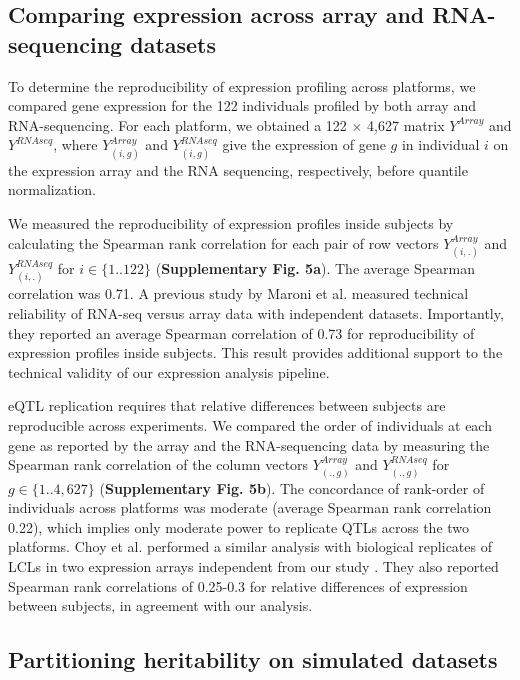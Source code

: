 \subsection{Comparing expression across array and RNA-sequencing datasets}

To determine the reproducibility of expression profiling across
platforms, we compared gene expression for the 122 individuals profiled
by both array and RNA-sequencing. For each platform, we obtained a 122
$\times$ 4,627 matrix $Y^{Array}$ and $Y^{RNAseq}$, where
$Y_{(i,g)}^{Array}$ and $Y_{(i,g)}^{RNAseq}$ give the expression of gene
$g$ in individual $i$ on the expression array and the RNA sequencing,
respectively, before quantile normalization.

We measured the reproducibility of expression profiles inside subjects
by calculating the Spearman rank correlation for each pair of row
vectors $Y_{(i,.)}^{Array}$ and $Y_{(i,.)}^{RNAseq}$ for
$i\in\{1..122\}$ (\textbf{Supplementary Fig. 5a}). The average Spearman correlation was 0.71. A previous
study by Maroni et al. \cite{MarioniMasonManeEtAl2008} measured technical reliability of
RNA-seq versus array data with independent datasets. Importantly, they
reported an average Spearman correlation of 0.73 for reproducibility of
expression profiles inside subjects. This result provides additional
support to the technical validity of our expression analysis pipeline.

eQTL replication requires that relative differences between
subjects are reproducible across experiments. We compared the order of
individuals at each gene as reported by the array and the RNA-sequencing
data by measuring the Spearman rank correlation of the column vectors
$Y_{(.,g)}^{Array}$ and $Y_{(.,g)}^{RNAseq}$ for $g\in\{1..4,627\}$ (\textbf{Supplementary Fig. 5b}). The
concordance of rank-order of individuals across platforms was moderate
(average Spearman rank correlation 0.22), which implies only moderate
power to replicate QTLs across the two platforms. Choy et al. performed
a similar analysis with biological replicates of LCLs in two expression
arrays independent from our study \cite{ChoyYelenskyBonakdarEtAl2008}. They also reported
Spearman rank correlations of 0.25-0.3 for relative differences of
expression between subjects, in agreement with our analysis.



\subsection{Partitioning heritability on simulated datasets}

